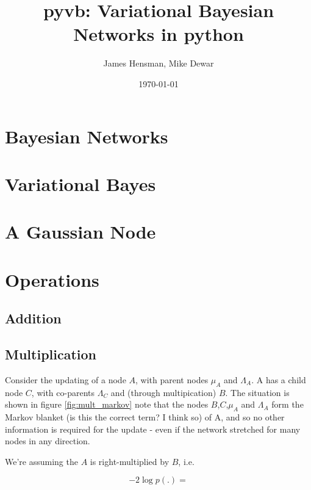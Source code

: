 \documentclass{article}
\title{pyvb: Variational Bayesian Networks in python}
\author{James Hensman, Mike Dewar}
\date{\today}
\begin{document}
\maketitle

\section{Bayesian Networks}
\section{Variational Bayes}
\section{A Gaussian Node}


\section{Operations}
\subsection{Addition}
\subsection{Multiplication}
Consider the updating of a node $A$, with parent nodes $\mu_A$ and $\Lambda_A$.  A has a child node $C$, with co-parents $\Lambda_C$ and (through multipication) $B$.  The situation is shown in figure \ref{fig:mult_markov}
note that the nodes $B$,$C$,$\mu_A$ and $\Lambda_A$ form the Markov blanket (is this the correct term? I think so) of A, and so no other information is required for the update - even if the network stretched for many nodes in any direction.  

We're assuming the $A$ is right-multiplied by $B$, i.e. %

\begin{equation}
-2 \log p(.) = 
\end{equation}
\end{document}

